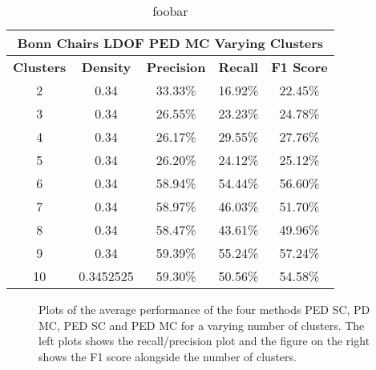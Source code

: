 \begin{table}[H]
\centering
\begin{tabular}{|c|c|c|c|c|}
\hline
\multicolumn{5}{|c|}{Bonn Chairs LDOF PED MC Varying Clusters}                        \\ \hline
\textbf{Clusters} & \textbf{Density} & \textbf{Precision} & \textbf{Recall} & \textbf{F1 Score} \\ \hline
2 & 0.34 & 33.33\%   & 16.92\%     & 22.45\%  \\ \hline
3 & 0.34 & 26.55\%   & 23.23\%     & 24.78\%  \\ \hline
4 & 0.34 & 26.17\%   & 29.55\%     & 27.76\%  \\ \hline
5 & 0.34 & 26.20\%   & 24.12\%     & 25.12\%  \\ \hline
6 & 0.34 & 58.94\%   & 54.44\%     & 56.60\%  \\ \hline
7 & 0.34 & 58.97\%   & 46.03\%     & 51.70\%  \\ \hline
8 & 0.34 & 58.47\%   & 43.61\%     & 49.96\%  \\ \hline
9 & 0.34 & 59.39\%   & 55.24\%     & 57.24\%  \\ \hline              
10 & 0.3452525  & 59.30\%   & 50.56\%     & 54.58\%  \\ \hline
\end{tabular}
\caption[Bonn Chairs PED MC Varying Clusters]{foobar}
\label{tab:bonn_chairs_ldof_sed_c_6_9_10_eval_ped_mc}
\end{table}


\begin{figure}[H]
\begin{center}

\end{center}
\caption[Chair 3 Cast avg statistic plots]{Plots of the average performance of the four methods PED SC, PD MC, PED SC and PED MC for a varying number of clusters. The left plots shows the recall/precision plot and the figure on the right shows the F1 score alongside the number of clusters.}
\label{fig:bonn_chairs_plot_avg_stat}
\end{figure}



